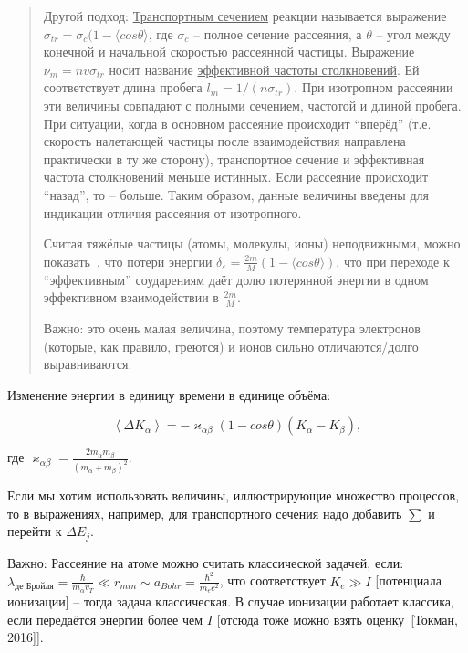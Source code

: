 \documentclass[10pt, a4paper]{article}
\newcommand{\Tokman}{~[Токман, 2016]}
\begin{document}
\begin{quotation}

Другой подход\cite{raizer}: \uline{Транспортным сечением} реакции называется выражение $\sigma_{tr} = \sigma_c(1-\langle {cos\theta}\rangle$, где $\sigma_c$ -- полное сечение рассеяния, а $\theta$ -- угол между конечной и начальной скоростью рассеянной частицы. Выражение $\nu_m = nv\sigma_{tr}$ носит название \uline{эффективной частоты столкновений}. Ей соответствует длина пробега $l_m = 1/(n\sigma_{tr})$. При изотропном рассеянии эти величины совпадают с полными сечением, частотой и длиной пробега. При ситуации, когда в основном рассеяние происходит ``вперёд'' (т.е. скорость налетающей частицы после взаимодействия направлена практически в ту же сторону), транспортное сечение и эффективная частота столкновений меньше истинных. Если рассеяние происходит ``назад'', то -- больше. Таким образом, данные величины введены для индикации отличия рассеяния от изотропного.

Считая тяжёлые частицы (атомы, молекулы, ионы) неподвижными, можно показать~\cite{raizer}, что потери энергии $\delta_\varepsilon = \frac{2m}{M}(1-\langle cos\theta\rangle)$, что при переходе к ``эффективным'' соударениям даёт долю потерянной энергии в одном эффективном взаимодействии в $\frac{2m}{M}$. 

Важно: это очень малая величина, поэтому температура электронов (которые, \uline{как правило}, греются) и ионов сильно отличаются/долго выравниваются.

\end{quotation}

Изменение энергии в единицу времени в единице объёма:

\begin{equation*}
	\left \langle \Delta K_\alpha \right \rangle = - \varkappa_{\alpha\beta} (1-cos\theta) (K_\alpha-K_\beta),
\end{equation*}

где $\varkappa_{\alpha\beta} = \frac{2m_\alpha m_\beta}{(m_\alpha+m_\beta)^2}$.

Если мы хотим использовать величины, иллюстрирующие множество процессов, то в выражениях, например, для транспортного сечения надо добавить $\sum$ и перейти к $\Delta E_j$. 

Важно: Рассеяние на атоме можно считать классической задачей, если: $\lambda_\text{де Бройля} = \frac{\hbar}{m_\alpha v_T} \ll r_{min} \sim a_{Bohr} = \frac{\hbar^2}{m_e e^2}$, что соответствует $K_e \gg I$ [потенциала ионизации] -- тогда задача классическая. В случае ионизации работает классика, если передаётся энергии более чем $I$ [отсюда тоже можно взять оценку\Tokman].
\end{document}
